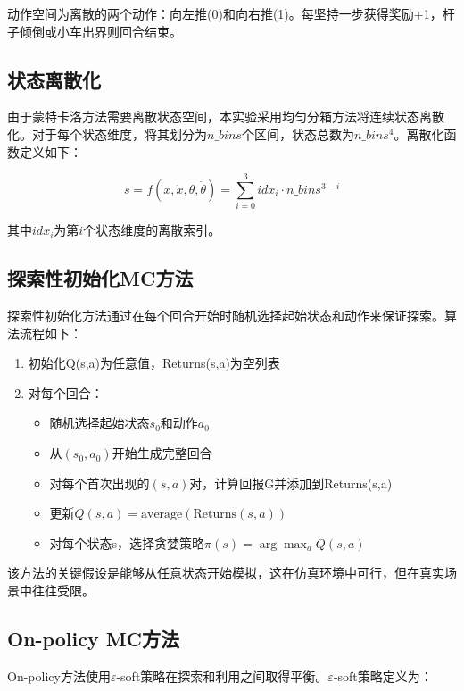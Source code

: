 \documentclass[12pt,a4paper]{article}
\begin{document}
动作空间为离散的两个动作：向左推(0)和向右推(1)。每坚持一步获得奖励+1，杆子倾倒或小车出界则回合结束。

\subsection{状态离散化}

由于蒙特卡洛方法需要离散状态空间，本实验采用均匀分箱方法将连续状态离散化。对于每个状态维度，将其划分为$n\_bins$个区间，状态总数为$n\_bins^4$。离散化函数定义如下：

\begin{equation}
s = f(x, \dot{x}, \theta, \dot{\theta}) = \sum_{i=0}^{3} idx_i \cdot n\_bins^{3-i}
\end{equation}

其中$idx_i$为第$i$个状态维度的离散索引。

\subsection{探索性初始化MC方法}

探索性初始化方法通过在每个回合开始时随机选择起始状态和动作来保证探索。算法流程如下：

\begin{enumerate}
    \item 初始化Q(s,a)为任意值，Returns(s,a)为空列表
    \item 对每个回合：
    \begin{itemize}
        \item 随机选择起始状态$s_0$和动作$a_0$
        \item 从$(s_0, a_0)$开始生成完整回合
        \item 对每个首次出现的$(s,a)$对，计算回报G并添加到Returns(s,a)
        \item 更新$Q(s,a) = \text{average}(\text{Returns}(s,a))$
        \item 对每个状态s，选择贪婪策略$\pi(s) = \arg\max_a Q(s,a)$
    \end{itemize}
\end{enumerate}

该方法的关键假设是能够从任意状态开始模拟，这在仿真环境中可行，但在真实场景中往往受限。

\subsection{On-policy MC方法}

On-policy方法使用$\varepsilon$-soft策略在探索和利用之间取得平衡。$\varepsilon$-soft策略定义为：
\end{document}
